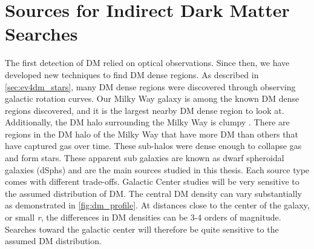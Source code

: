 \section{Sources for Indirect Dark Matter Searches\label{sec:dm_targets}}

\begin{figure}
\end{figure}

The first detection of DM relied on optical observations.
Since then, we have developed new techniques to find DM dense regions.
As described in \cref{sec:ev4dm_stars}, many DM dense regions were discovered through observing galactic rotation curves.
Our Milky Way galaxy is among the known DM dense regions discovered, and it is the largest nearby DM dense region to look at.
Additionally, the DM halo surrounding the Milky Way is clumpy \cite{Tracy:les_houches}.
There are regions in the DM halo of the Milky Way that have more DM than others that have captured gas over time.
These sub-halos were dense enough to collapse gas and form stars.
These apparent sub galaxies are known as dwarf spheroidal galaxies (dSphs) and are the main sources studied in this thesis.
Each source type comes with different trade-offs.
Galactic Center studies will be very sensitive to the assumed distribution of DM.
The central DM density can vary substantially as demonstrated in \cref{fig:dm_profile}.
At distances close to the center of the galaxy, or small \textit{r}, the differences in DM densities can be 3-4 orders of magnitude.
Searches toward the galactic center will therefore be quite sensitive to the assumed DM distribution.

